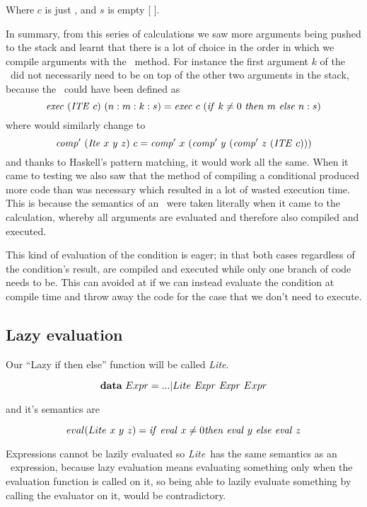 \documentclass {article}
\begin{document}
\noindent Where $c$ is just \HALTt, and $s$ is empty [ ].

In summary, from this series of calculations we saw more
arguments being pushed to the stack and learnt that
there is a lot of choice in the order in which we
compile arguments with the \BH\ method. 
For instance the first argument $k$
of the \ite\ did not necessarily need to be on top
of the other two arguments in the stack, because
the \exec\ could have been defined as
\[ \mathit{exec\ } (\mathit{ITE\ } c)\ (n:m:k:s) 
		= \mathit{exec\ } c\ (\mathit{if\ } k \not= 0\ \mathit{then\ } m\ \mathit{else\ } n:s) \]
\noindent where \compp would similarly change to
\[ \mathit{comp'\ } (\mathit{Ite\ } x\ y\ z)\ c = 
		\mathit{comp'\ }  x\ (\mathit{comp'\ }  y\ (\mathit{comp'\ }  z\ (\mathit{ITE\ } c))) \]
\noindent and thanks to Haskell's pattern matching,
it would work all the same.
When it came to testing we also saw that the method
of compiling a conditional produced more code than was 
necessary which resulted in a lot of wasted
execution time. 
This is because the semantics of an \ite\ were
taken literally when it came to the calculation,
whereby all arguments are evaluated
and therefore also compiled and executed.

This kind of evaluation of the condition
is eager; in that both cases regardless of the
condition's result, are compiled and executed
while only one branch of code needs to be.
This can avoided at if we can instead
evaluate the condition at compile time
and throw away the code for the case
that we don't need to execute.

\pagebreak
\subsection{Lazy evaluation}

\newcommand{\lite}{\textit{Lite}}

Our ``Lazy if then else'' function
 will be called \lite.

	\[ \textbf{data}\ Expr = ... | Lite\ \mathit{Expr\ } \mathit{Expr\ } Expr \]

and it's semantics are

\begin{equation}
eval(Lite\ x\ y\ z) \\
	= \mathit{if\ } \mathit{eval\ }  x \not= 0 \mathit{then\ } \mathit{eval\ }  y\ \mathit{else\ } \mathit{eval\ }  z 
			\label{evallite}
\end{equation}

Expressions cannot be lazily evaluated
so \lite\ has the same semantics
as an \ite\ expression,
because lazy evaluation means evaluating
something only when the evaluation function
is called on it,
so being able to lazily evaluate something 
by calling the evaluator on it,
would be contradictory.
\end{document}
